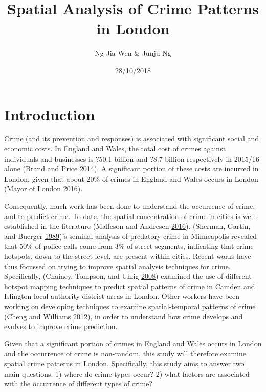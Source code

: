 \documentclass[]{article}
\title{Spatial Analysis of Crime Patterns in London}
\author{Ng Jia Wen \& Junju Ng}
\date{28/10/2018}
\begin{document}
\maketitle

{
\setcounter{tocdepth}{2}
\tableofcontents
}
\pagebreak

\pagebreak

\section{Introduction}\label{introduction}

Crime (and its prevention and responses) is associated with significant
social and economic costs. In England and Wales, the total cost of
crimes against individuals and businesses is ?50.1 billion and ?8.7
billion respectively in 2015/16 alone (Brand and Price
\protect\hyperlink{ref-Brand2014}{2014}). A significant portion of these
costs are incurred in London, given that about 20\% of crimes in England
and Wales occurs in London (Mayor of London
\protect\hyperlink{ref-MayorofLondon2016}{2016}).

Consequently, much work has been done to understand the occurrence of
crime, and to predict crime. To date, the spatial concentration of crime
in cities is well-established in the literature (Malleson and Andresen
\protect\hyperlink{ref-Malleson2016}{2016}). (Sherman, Gartin, and
Buerger \protect\hyperlink{ref-Sherman1989}{1989})'s seminal analysis of
predatory crime in Minneapolis revealed that 50\% of police calls come
from 3\% of street segments, indicating that crime hotspots, down to the
street level, are present within cities. Recent works have thus focussed
on trying to improve spatial analysis techniques for crime.
Specifically, (Chainey, Tompson, and Uhlig
\protect\hyperlink{ref-Chainey2008}{2008}) examined the use of different
hotspot mapping techniques to predict spatial patterns of crime in
Camden and Islington local authority district areas in London. Other
workers have been working on developing techniques to examine
spatial-temporal patterns of crime (Cheng and Williams
\protect\hyperlink{ref-Cheng2012}{2012}), in order to understand how
crime develops and evolves to improve crime prediction.

Given that a significant portion of crimes in England and Wales occurs
in London and the occurrence of crime is non-random, this study will
therefore examine spatial crime patterns in London. Specifically, this
study aims to answer two main questions: 1) where do crime types occur?
2) what factors are associated with the occurrence of different types of
crime?
\end{document}
